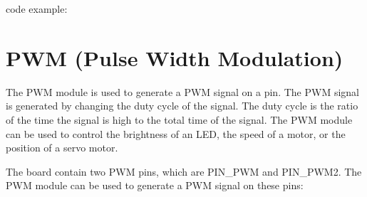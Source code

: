 \documentclass[letterpaper,10pt,english]{sphinxmanual}
\begin{document}
\sphinxAtStartPar
code example:

\begin{sphinxVerbatim}[commandchars=\\\{\}]
  

 

                
            
              

          

\end{sphinxVerbatim}

\sphinxstepscope


\chapter{PWM (Pulse Width Modulation)}
\label{\detokenize{pwm:pwm-pulse-width-modulation}}\label{\detokenize{pwm::doc}}
\sphinxAtStartPar
The PWM module is used to generate a PWM signal on a pin. The PWM signal is generated by changing the duty cycle of the signal. The duty cycle is the ratio of the time the signal is high to the total time of the signal. The PWM module can be used to control the brightness of an LED, the speed of a motor, or the position of a servo motor.

\sphinxAtStartPar
The board contain two PWM pins, which are PIN\_PWM and PIN\_PWM2. The PWM module can be used to generate a PWM signal on these pins:
\end{document}
